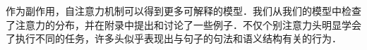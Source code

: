 



作为副作用，自注意力机制可以得到更多可解释的模型．我们从我们的模型中检查了注意力的分布，并在附录中提出和讨论了一些例子．不仅个别注意力头明显学会了执行不同的任务，许多头似乎表现出与句子的句法和语义结构有关的行为．
